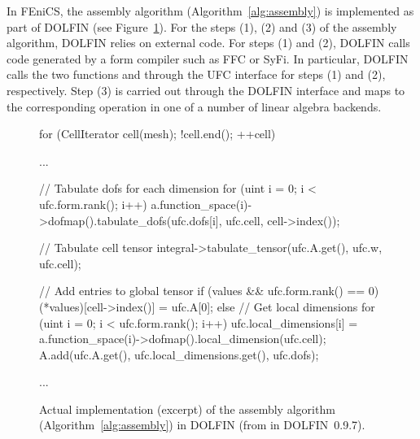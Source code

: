 In FEniCS, the assembly algorithm (Algorithm~\ref{alg:assembly}) is
implemented as part of DOLFIN (see
Figure~\ref{fig:assembly,code}). For the steps (1), (2) and (3) of the
assembly algorithm, DOLFIN relies on external code. For steps (1) and
(2), DOLFIN calls code generated by a form compiler such as FFC or
SyFi. In particular, DOLFIN calls the two
functions  and
 through the UFC interface for steps (1) and (2),
respectively. Step (3) is carried out through the DOLFIN
 interface and maps to the corresponding
operation in one of a number of linear algebra backends.
%
\begin{figure}
  \begin{code}
for (CellIterator cell(mesh); !cell.end(); ++cell)
{
  ...

  // Tabulate dofs for each dimension
  for (uint i = 0; i < ufc.form.rank(); i++)
    a.function_space(i)->dofmap().tabulate_dofs(ufc.dofs[i],
                                                ufc.cell,
                                                cell->index());

  // Tabulate cell tensor
  integral->tabulate_tensor(ufc.A.get(), ufc.w, ufc.cell);

  // Add entries to global tensor
  if (values && ufc.form.rank() == 0)
    (*values)[cell->index()] = ufc.A[0];
  else
  {
    // Get local dimensions
    for (uint i = 0; i < ufc.form.rank(); i++)
      ufc.local_dimensions[i] =
        a.function_space(i)->dofmap().local_dimension(ufc.cell);
    A.add(ufc.A.get(), ufc.local_dimensions.get(), ufc.dofs);
  }

  ...
}
\end{code}
  \label{fig:assembly,code}
  \caption{Actual implementation (excerpt) of the assembly algorithm
    (Algorithm~\ref{alg:assembly}) in DOLFIN (from 
    in DOLFIN~0.9.7).}
\end{figure}

